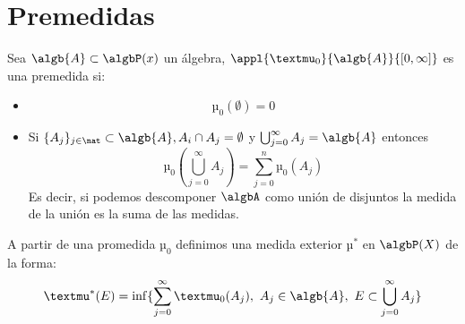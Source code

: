 \documentclass{apuntes}
\begin{document}
\section{Premedidas}
\begin{defn}[Premedida]
Sea $\algb{A} \subset \algbP(x)$ un álgebra, $\appl{µ_0}{\algb{A}}{[0, \infty]}$ es una premedida si:
\begin{itemize}
\item
\[µ_0(\emptyset)=0\]
\item Si $\{A_j\}_{j \in \nat} \subset \algb{A}, A_i \cap A_j = \emptyset$ y $\bigcup_{j=0}^{\infty}A_j = \algb{A}$ entonces
\[µ_0(\bigcup_{j=0}^{\infty}A_j) = \sum_{j=0}^{n}µ_0(A_j)\]
Es decir, si podemos descomponer $\algbA$ como unión de disjuntos la medida de la unión es la suma de las medidas.
\end{itemize}
\end{defn}

A partir de una promedida $µ_0$ definimos una medida exterior $µ^*$ en $\algbP(X)$ de la forma:
\[µ^*(E) = \inf \{\sum_{j=0}^{\infty} µ_0(A_j), \ A_j \in \algb{A}, \ E \subset \bigcup_{j=0}^{\infty}A_j\}\]
\end{document}
